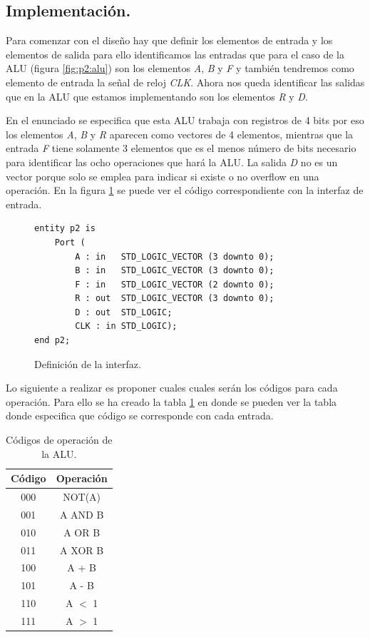 \documentclass{article}
\begin{document}
\subsection{Implementación.}

Para comenzar con el diseño hay que definir los elementos de entrada y los elementos de salida
para ello identificamos las entradas que para el caso de la ALU (figura \ref{fig:p2:alu}) son los elementos \emph{A}, \emph{B} y \emph{F} y también tendremos como elemento de entrada la señal de reloj \emph{CLK}. Ahora nos queda identificar las salidas que en la ALU que estamos implementando son los elementos \emph{R} y \emph{D}.

En el enunciado se especifica que esta ALU trabaja con registros de 4 bits por eso los elementos \emph{A}, \emph{B} y \emph{R} aparecen como vectores de 4 elementos, mientras que la entrada \emph{F} tiene solamente 3 elementos que es el menos número de bits necesario para identificar las ocho operaciones que hará la ALU. La salida \emph{D} no es un vector porque solo se emplea para indicar si existe o no overflow en una operación. En la figura \ref{cod:p2:interfaz} se puede ver el código correspondiente con la interfaz de entrada.

\begin{figure}[h]
	\begin{lstlisting}[style=vhdl]
entity p2 is
	Port ( 
		A : in   STD_LOGIC_VECTOR (3 downto 0);
		B : in   STD_LOGIC_VECTOR (3 downto 0);
		F : in   STD_LOGIC_VECTOR (2 downto 0);
		R : out  STD_LOGIC_VECTOR (3 downto 0);
		D : out  STD_LOGIC;
		CLK : in STD_LOGIC);
end p2;
	\end{lstlisting}
	\caption{Definición de la interfaz.}
	\label{cod:p2:interfaz}
\end{figure}

Lo siguiente a realizar es proponer cuales cuales serán los códigos para cada operación. Para ello se ha creado la tabla
\ref{tab:p2:cod_operacion}
en donde se pueden ver la tabla donde especifica que código se corresponde con cada entrada.

\begin{table}
	\begin{center}
		\begin{tabular}{|c|c|}
\hline
\textbf{Código} & \textbf{Operación} \\ \hline
\hline
000 & NOT(A) \\ \hline
001 & A AND B\\ \hline
010 & A OR B \\ \hline
011 & A XOR B\\ \hline
100 & A + B  \\ \hline
101 & A - B  \\ \hline
110 & A $<$  1  \\ \hline
111 & A $>$   1  \\ \hline
		\end{tabular}
		\caption{Códigos de operación de la ALU.}
		\label{tab:p2:cod_operacion}
	\end{center}
\end{table}
\end{document}
